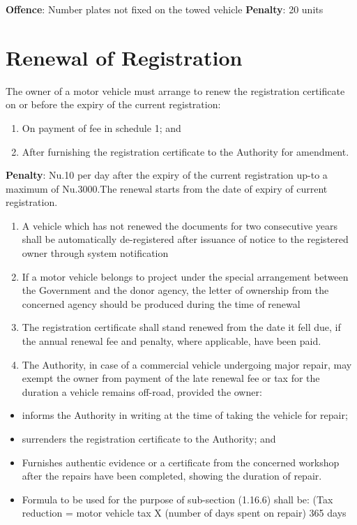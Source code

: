 \documentclass[
]{book}
\providecommand{\tightlist}{%
  \setlength{\itemsep}{0pt}\setlength{\parskip}{0pt}}
\begin{document}
\textbf{Offence}: Number plates not fixed on the towed vehicle
\textbf{Penalty}: 20 units

\hypertarget{renewal-of-registration}{%
\section{Renewal of Registration}\label{renewal-of-registration}}

The owner of a motor vehicle must arrange to renew the registration certificate on or before the expiry of the current registration:

\begin{enumerate}
\def\labelenumi{\alph{enumi}.}
\tightlist
\item
  On payment of fee in schedule 1; and
\item
  After furnishing the registration certificate to the Authority for amendment.
\end{enumerate}

\textbf{Penalty}: Nu.10 per day after the expiry of the current registration up-to a maximum of Nu.3000.The renewal starts from the date of expiry of current registration.

\begin{enumerate}
\def\labelenumi{\alph{enumi}.}
\setcounter{enumi}{2}
\tightlist
\item
  A vehicle which has not renewed the documents for two consecutive years shall be automatically de-registered after issuance of notice to the registered owner through system notification
\item
  If a motor vehicle belongs to project under the special arrangement between the Government and the donor agency, the letter of ownership from the concerned agency should be produced during the time of renewal
\item
  The registration certificate shall stand renewed from the date it fell due, if the annual renewal fee and penalty, where applicable, have been paid.
\item
  The Authority, in case of a commercial vehicle undergoing major repair, may exempt the owner from payment of the late renewal fee or tax for the duration a vehicle remains off-road, provided the owner:
\end{enumerate}

\begin{itemize}
\tightlist
\item
  informs the Authority in writing at the time of taking the vehicle for repair;
\item
  surrenders the registration certificate to the Authority; and
\item
  Furnishes authentic evidence or a certificate from the concerned workshop after the repairs have been completed, showing the duration of repair.
\item
  Formula to be used for the purpose of sub-section (1.16.6) shall be:
  (Tax reduction = motor vehicle tax X (number of days spent on repair)
  365 days
\end{itemize}
\end{document}
